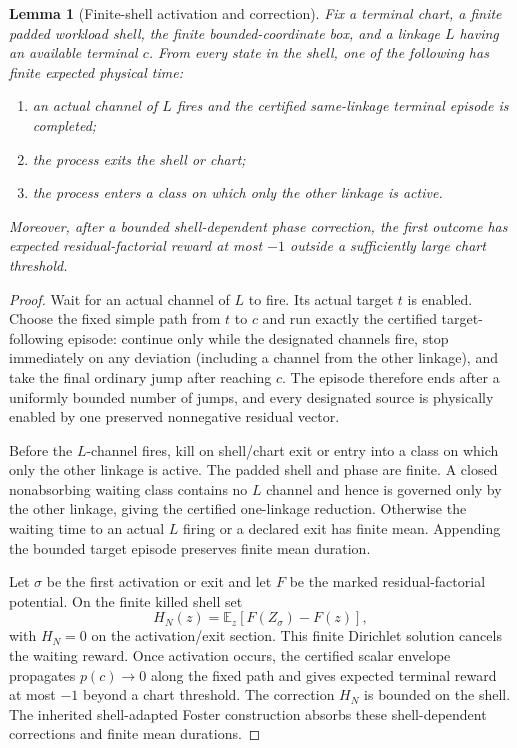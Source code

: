 \documentclass[11pt]{article}
\newtheorem{lemma}[theorem]{Lemma}
\theoremstyle{definition}\newtheorem{definition}[theorem]{Definition}
\theoremstyle{remark}\newtheorem{remark}[theorem]{Remark}
\begin{document}
\begin{lemma}[Finite-shell activation and correction]\label{lem:activation}
Fix a terminal chart, a finite padded workload shell, the finite bounded-coordinate box, and a linkage $L$ having an available terminal $c$.  From every state in the shell, one of the following has finite expected physical time:
\begin{enumerate}
\item an actual channel of $L$ fires and the certified same-linkage terminal episode is completed;
\item the process exits the shell or chart;
\item the process enters a class on which only the other linkage is active.
\end{enumerate}
Moreover, after a bounded shell-dependent phase correction, the first outcome has expected residual-factorial reward at most $-1$ outside a sufficiently large chart threshold.
\end{lemma}

\begin{proof}
Wait for an actual channel of $L$ to fire.  Its actual target $t$ is enabled.  Choose the fixed simple path from $t$ to $c$ and run exactly the certified target-following episode: continue only while the designated channels fire, stop immediately on any deviation (including a channel from the other linkage), and take the final ordinary jump after reaching $c$.  The episode therefore ends after a uniformly bounded number of jumps, and every designated source is physically enabled by one preserved nonnegative residual vector.

Before the $L$-channel fires, kill on shell/chart exit or entry into a class on which only the other linkage is active.  The padded shell and phase are finite.  A closed nonabsorbing waiting class contains no $L$ channel and hence is governed only by the other linkage, giving the certified one-linkage reduction.  Otherwise the waiting time to an actual $L$ firing or a declared exit has finite mean.  Appending the bounded target episode preserves finite mean duration.

Let $\sigma$ be the first activation or exit and let $F$ be the marked residual-factorial potential.  On the finite killed shell set
\[
 H_N(z)=\mathbb E_z[F(Z_\sigma)-F(z)],
\]
with $H_N=0$ on the activation/exit section.  This finite Dirichlet solution cancels the waiting reward.  Once activation occurs, the certified scalar envelope propagates $p(c)\to0$ along the fixed path and gives expected terminal reward at most $-1$ beyond a chart threshold.  The correction $H_N$ is bounded on the shell.  The inherited shell-adapted Foster construction absorbs these shell-dependent corrections and finite mean durations.
\end{proof}
\end{document}
